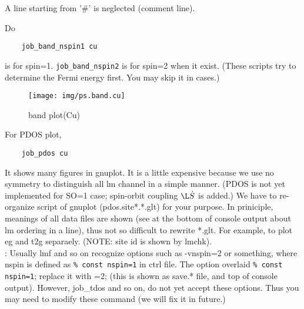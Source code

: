\documentclass[a4paper,10pt,epsf,fleqn]{article}
\begin{document}
A line starting from '\#' is neglected (comment line).

Do
\begin{verbatim}
    job_band_nspin1 cu
\end{verbatim}
is for spin=1. \verb+job_band_nspin2+ is for spin=2 when it exist.
(These scripts try to determine the Fermi energy first. You may skip it in cases.)

\begin{figure}[h]
 \begin{center}
  \texttt{[image: img/ps.band.cu]}
  \caption{band plot(Cu)}
 \end{center}
\end{figure}

For PDOS plot,
\begin{verbatim}
    job_pdos cu
\end{verbatim}
It shows many figures in gnuplot. It is a little expensive because we
use no symmetry to distinguish all lm channel in a simple manner.
(PDOS is not yet implemented for SO=1 case; spin-orbit coupling $\L\dot S$ is added.)
We have to re-organize script of gnuplot (pdos.site*.*.glt) for your purpose.
In priniciple, meanings of all data files are shown (see at the bottom
of console output about lm ordering in a line), thus not so difficult to
rewrite *.glt. For example, to plot eg and t2g separaely. 
(NOTE: site id is shown by lmchk).\\

: Usually lmf and so on recognize options such as -vnspin=2 or
something, where nspin is defined as \verb+% const nspin=1+ in ctrl file.
The option overlaid \verb+% const nspin=1+; replace it with =2;
(this is shown as save.* file, and top of console output).
However, job\_tdos and so on, do not yet accept these options. Thus 
you may need to modify these command (we will fix it in future.)


\end{document}
